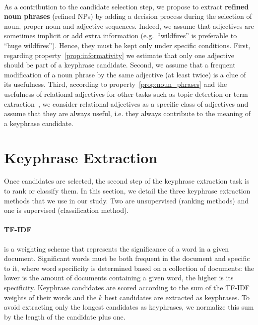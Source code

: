  \paragraph{}
  As a contribution to the candidate selection step, we propose to extract
  \textbf{refined noun phrases} (refined NPs) by adding a decision process
  during the selection of noun, proper noun and adjective sequences. Indeed,
  we assume that adjectives are sometimes implicit or add extra information
  (e.g.~``wildfires'' is preferable to ``huge wildfires''). Hence, they must be kept only under specific
  conditions. First, regarding property~\ref{prop:informativity} we estimate
  that only one adjective should be part of a keyphrase candidate. Second, we
  assume that a frequent modification of a noun phrase by the same adjective
  (at least twice) is a clue of its usefulness. Third, according to
  property~\ref{prop:noun_phrases} and the usefulness of relational adjectives
  for other tasks such as topic detection or term
  extraction~\cite{daille2001relationaladjectives}, we consider relational
  adjectives as a specific class of adjectives and assume that they are always
  useful, i.e. they always contribute to the meaning of a keyphrase candidate.

\section{Keyphrase Extraction}
\label{sec:keyphrase_extraction}
  Once candidates are selected, the second step of the keyphrase extraction task
  is to rank or classify them. In this section, we detail the three keyphrase
  extraction methods that we use in our study. Two are unsupervised (ranking
  methods) and one is supervised (classification method).

  \paragraph{TF-IDF~\textnormal{\cite{jones1972tfidf}}} is a weighting scheme
  that represents the significance of a word in a given document. Significant
  words must be both frequent in the document and specific to it, where word
  specificity is determined based on a collection of documents: the lower is the
  amount of documents containing a given word, the higher is its specificity.
  Keyphrase candidates are scored according to the sum of the TF-IDF weights of
  their words and the $k$ best candidates are extracted as keyphrases. To avoid
  extracting only the longest candidates as keyphrases, we normalize this sum by
  the length of the candidate plus one.

